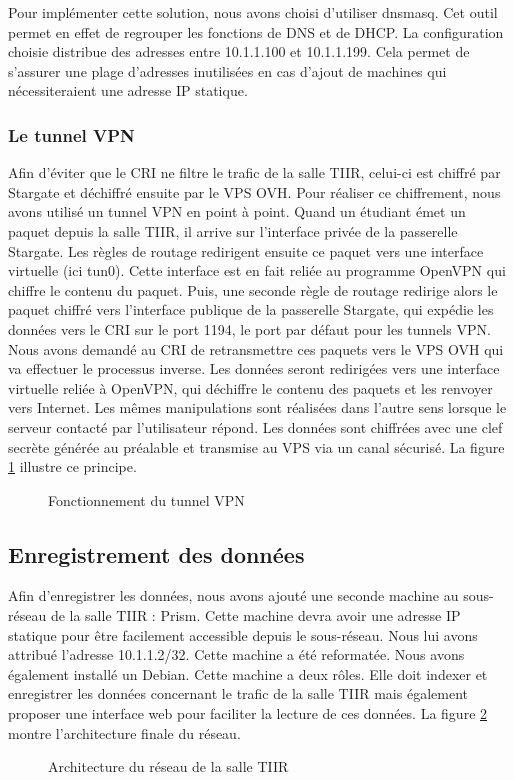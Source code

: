 Pour implémenter cette solution, nous avons choisi d'utiliser dnsmasq. Cet outil permet en effet de regrouper les fonctions de DNS et de DHCP. La configuration choisie distribue des adresses entre 10.1.1.100 et 10.1.1.199. Cela permet de s'assurer une plage d'adresses inutilisées en cas d'ajout de machines qui nécessiteraient une adresse IP statique.

\subsubsection{Le tunnel VPN}

Afin d'éviter que le CRI ne filtre le trafic de la salle TIIR, celui-ci est chiffré par Stargate et déchiffré ensuite par le VPS OVH. Pour réaliser ce chiffrement, nous avons utilisé un tunnel VPN en point à point. Quand un étudiant émet un paquet depuis la salle TIIR, il arrive sur l'interface privée de la passerelle Stargate. Les règles de routage redirigent ensuite ce paquet vers une interface virtuelle (ici tun0). Cette interface est en fait reliée au programme OpenVPN qui chiffre le contenu du paquet. Puis, une seconde règle de routage redirige alors le paquet chiffré vers l'interface publique de la passerelle Stargate, qui expédie les données vers le CRI sur le port 1194, le port par  défaut pour les tunnels VPN. Nous avons demandé au CRI de retransmettre ces paquets vers le VPS OVH qui va effectuer le processus inverse. Les données seront redirigées vers une interface virtuelle reliée à OpenVPN, qui déchiffre le contenu des paquets et les renvoyer vers Internet. Les mêmes manipulations sont réalisées dans l'autre sens lorsque le serveur contacté par l'utilisateur répond. Les données sont chiffrées avec une clef secrète générée au préalable et transmise au VPS via un canal sécurisé. La figure \ref{tunnel} illustre ce principe.

\begin{figure}[!h]
\centering
\def\svgwidth{\columnwidth}

\caption{Fonctionnement du tunnel VPN}
\label{tunnel}
\end{figure}

\subsection{Enregistrement des données}

Afin d'enregistrer les données, nous avons ajouté une seconde machine au sous-réseau de la salle TIIR : Prism. Cette machine devra avoir une adresse IP statique pour être facilement accessible depuis le sous-réseau. Nous lui avons attribué l'adresse 10.1.1.2/32. Cette machine a été reformatée. Nous avons également installé un Debian. Cette machine a deux rôles. Elle doit indexer et enregistrer les données concernant le trafic de la salle TIIR mais également proposer une interface web pour faciliter la lecture de ces données. La figure \ref{architecture_finale} montre l'architecture finale du réseau.

\begin{figure}[!h]
\centering
\def\svgwidth{\columnwidth}

\caption{Architecture du réseau de la salle TIIR}
\label{architecture_finale}
\end{figure}


